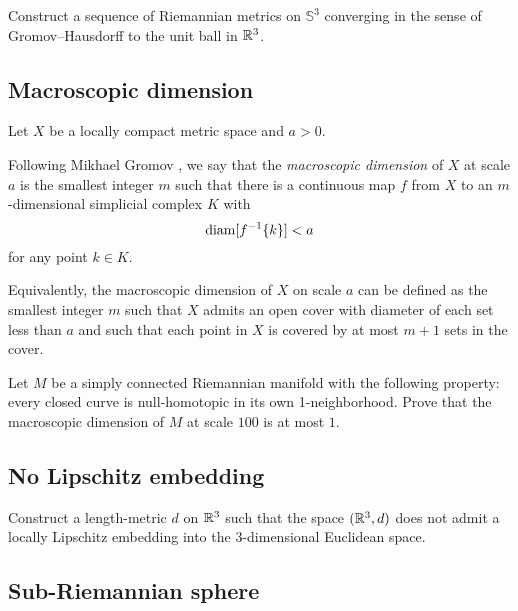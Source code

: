 \begin{pr}
Construct a sequence of Riemannian metrics on $\mathbb{S}^3$ converging in the sense of Gromov--Hausdorff 
to the unit ball in $\mathbb{R}^3$.
\end{pr}

\subsection*{Macroscopic dimension\easy}
\label{macroscopic dimension} 

Let $X$ be a locally compact metric space
and $a>0$.

Following Mikhael Gromov \cite{gromov:macroscopic-dimension},
we say that the \emph{macroscopic dimension}  of $X$ at scale $a$ is the smallest integer $m$ such that there is a continuous map $f$ from $X$ to an $m$-dimensional simplicial complex $K$
with 
\[\operatorname{\rm diam}\nolimits[f^{-1}\{k\}]<a\]
for any point $k\in K$.

Equivalently, the macroscopic dimension of $X$ on scale $a$ can be defined as 
the smallest integer $m$ such that $X$ admits an open cover with diameter of each set less than $a$ 
and such that each point in $X$ is covered by at most $m+1$ sets in the cover.

\begin{pr}
Let $M$ be a simply connected Riemannian manifold with the following property: 
every closed curve is null-homotopic 
in its own  1-neighborhood. 
Prove that the macroscopic dimension of $M$ at scale $100$ is at most $1$.
\end{pr}

\subsection*{No Lipschitz embedding\hard}
\label{weird-metric} 

\begin{pr}
Construct a length-metric $d$ on $\mathbb{R}^3$ such that the space $(\mathbb{R}^3,d)$ does not admit a locally Lipschitz embedding into the 3-dimensional Euclidean space.
\end{pr}

\subsection*{Sub-Riemannian sphere\thm}
\label{sub-Riemannian} 

